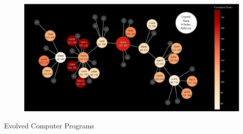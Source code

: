 \documentclass[aspectratio=169]{beamer}
\makeatletter
\renewcommand{\emphasis}[1]{{\Huge \color{pureminimalistic@text@red} #1}}
\makeatother
\begin{document}
\begin{frame}[plain]
  \begin{figure}
  \centering
  \includegraphics[width=1.0\linewidth,keepaspectratio]{figures/tree.pdf}
  \end{figure}
  \begin{center}
  \emphasis{Evolved Computer Programs}
  \end{center}
\end{frame}
\end{document}

